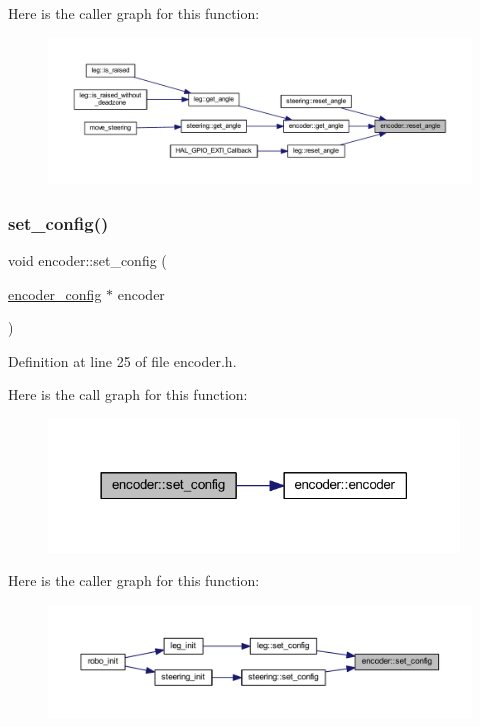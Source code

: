 Here is the caller graph for this function\+:
\nopagebreak
\begin{figure}[H]
\begin{center}
\leavevmode
\includegraphics[width=350pt]{classencoder_af37dc5bf8a2323a500dd55f5fef12afb_icgraph}
\end{center}
\end{figure}
\mbox{\label{classencoder_afb36996f08db7f27e2df5334f90c8e53}} 
\subsubsection{\texorpdfstring{set\_config()}{set\_config()}}
{\footnotesize\ttfamily void encoder\+::set\+\_\+config (\begin{DoxyParamCaption}\item[{\mbox{\hyperlink{structencoder__config}{encoder\+\_\+config}} $\ast$}]{encoder }\end{DoxyParamCaption})\hspace{0.3cm}{\ttfamily [inline]}}



Definition at line 25 of file encoder.\+h.

Here is the call graph for this function\+:
\nopagebreak
\begin{figure}[H]
\begin{center}
\leavevmode
\includegraphics[width=309pt]{classencoder_afb36996f08db7f27e2df5334f90c8e53_cgraph}
\end{center}
\end{figure}
Here is the caller graph for this function\+:
\nopagebreak
\begin{figure}[H]
\begin{center}
\leavevmode
\includegraphics[width=350pt]{classencoder_afb36996f08db7f27e2df5334f90c8e53_icgraph}
\end{center}
\end{figure}


